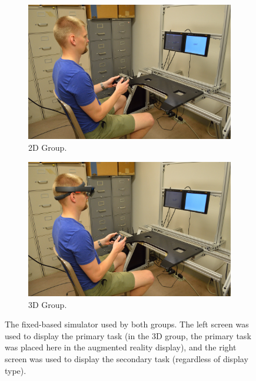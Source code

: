 \begin{figure}[t!]
    \begin{center}
        \begin{subfigure}{0.49\textwidth}
            \includegraphics[width=\linewidth]{figures/AR/DSC_0801.JPG}
            \caption[2D Group]{2D Group.}
        \end{subfigure}\hfill
        \begin{subfigure}{0.49\textwidth}
            \includegraphics[width=\linewidth]{figures/AR/DSC_0803.JPG}
            \caption[3D Group]{3D Group.}
        \end{subfigure}
        \caption[The fixed-based simulator used by both groups]{The fixed-based simulator used by both groups. The left screen was used to display the primary task (in the 3D group, the primary task was placed here in the augmented reality display), and the right screen was used to display the secondary task (regardless of display type).}%
        \label{fig:simulator}%
    \end{center}
\end{figure}

